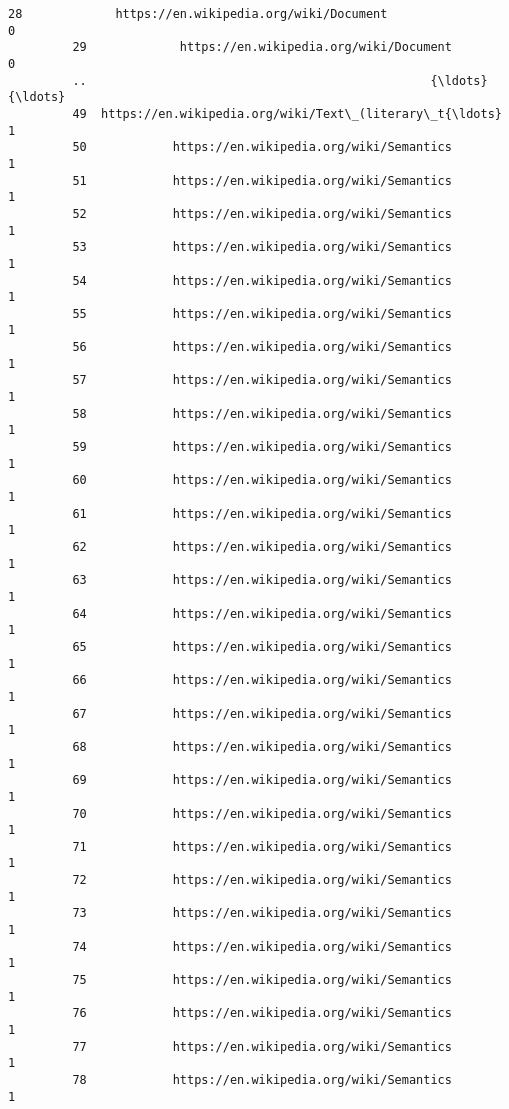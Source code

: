 \documentclass[11pt]{article}
\begin{document}
\begin{Verbatim}[commandchars=\\\{\}]
         28             https://en.wikipedia.org/wiki/Document                       0   
         29             https://en.wikipedia.org/wiki/Document                       0   
         ..                                                {\ldots}                     {\ldots}   
         49  https://en.wikipedia.org/wiki/Text\_(literary\_t{\ldots}                       1   
         50            https://en.wikipedia.org/wiki/Semantics                       1   
         51            https://en.wikipedia.org/wiki/Semantics                       1   
         52            https://en.wikipedia.org/wiki/Semantics                       1   
         53            https://en.wikipedia.org/wiki/Semantics                       1   
         54            https://en.wikipedia.org/wiki/Semantics                       1   
         55            https://en.wikipedia.org/wiki/Semantics                       1   
         56            https://en.wikipedia.org/wiki/Semantics                       1   
         57            https://en.wikipedia.org/wiki/Semantics                       1   
         58            https://en.wikipedia.org/wiki/Semantics                       1   
         59            https://en.wikipedia.org/wiki/Semantics                       1   
         60            https://en.wikipedia.org/wiki/Semantics                       1   
         61            https://en.wikipedia.org/wiki/Semantics                       1   
         62            https://en.wikipedia.org/wiki/Semantics                       1   
         63            https://en.wikipedia.org/wiki/Semantics                       1   
         64            https://en.wikipedia.org/wiki/Semantics                       1   
         65            https://en.wikipedia.org/wiki/Semantics                       1   
         66            https://en.wikipedia.org/wiki/Semantics                       1   
         67            https://en.wikipedia.org/wiki/Semantics                       1   
         68            https://en.wikipedia.org/wiki/Semantics                       1   
         69            https://en.wikipedia.org/wiki/Semantics                       1   
         70            https://en.wikipedia.org/wiki/Semantics                       1   
         71            https://en.wikipedia.org/wiki/Semantics                       1   
         72            https://en.wikipedia.org/wiki/Semantics                       1   
         73            https://en.wikipedia.org/wiki/Semantics                       1   
         74            https://en.wikipedia.org/wiki/Semantics                       1   
         75            https://en.wikipedia.org/wiki/Semantics                       1   
         76            https://en.wikipedia.org/wiki/Semantics                       1   
         77            https://en.wikipedia.org/wiki/Semantics                       1   
         78            https://en.wikipedia.org/wiki/Semantics                       1   
         

\end{Verbatim}
\end{document}
